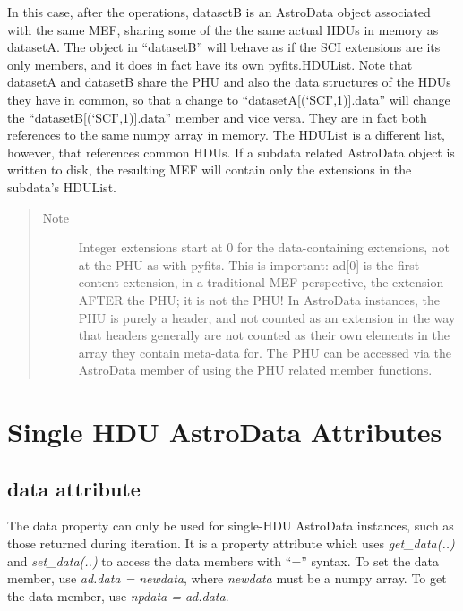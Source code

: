 \documentclass[letterpaper,10pt,english]{sphinxmanual}
\begin{document}
\begin{fulllineitems}
In this case, after the operations, datasetB is an AstroData object
associated with the same MEF, sharing some of the the same actual HDUs
in memory as  datasetA. The object in ``datasetB'' will behave as if the
SCI extensions are its only members, and it does in fact have its own
pyfits.HDUList. Note that datasetA and datasetB share the PHU and also
the data structures of the HDUs they have in common, so that a change
to ``datasetA{[}(`SCI',1){]}.data'' will change the 
``datasetB{[}(`SCI',1){]}.data'' member and vice versa. They are in fact both
references to the same numpy array in memory. The HDUList is a 
different list, however, that references common HDUs. If a subdata 
related AstroData object is written to disk, the resulting MEF will
contain only the extensions in the subdata's HDUList.
\begin{quote}\begin{description}
\item[{Note }] \leavevmode
Integer extensions start at 0 for the data-containing 
extensions, not at the PHU as with pyfits.  This is important:
ad{[}0{]} is the first content extension, in a traditional MEF 
perspective, the extension AFTER the PHU; it is not the PHU!  In
AstroData instances, the PHU is purely a header, and not counted
as an extension in the way that headers generally are not counted
as their own elements in the array they contain meta-data for.
The PHU can be accessed via the  AstroData member of using
the PHU related member functions.

\end{description}\end{quote}

\end{fulllineitems}



\section{Single HDU AstroData Attributes}
\label{chapter_AstroDataClass:single-hdu-astrodata-attributes}

\subsection{data attribute}
\label{chapter_AstroDataClass:data-attribute}

\begin{fulllineitems}
\label{chapter_AstroDataClass:astrodata.data.AstroData.data}
The data property can only be used for single-HDU AstroData
instances, such as those returned during iteration. It is a property
attribute which uses \emph{get\_data(..)} and \emph{set\_data(..)} to access the
data members with ``='' syntax. To set the data member, use \emph{ad.data =
newdata}, where \emph{newdata} must be a numpy array. To get the data
member, use \emph{npdata = ad.data}.

\end{fulllineitems}
\end{document}
